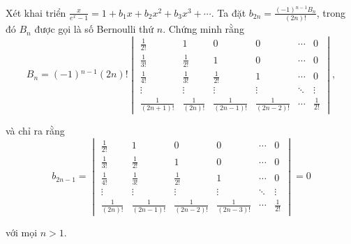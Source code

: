 \begin{exercise}
    Xét khai triển $\frac{x}{e^{x} - 1} = 1 + b_{1}x + b_{2}x^{2} + b_{3}x^{3} + \cdots$. Ta đặt $b_{2n} = \frac{(-1){}^{n-1}B_{n}}{(2n)!}$, trong đó $B_{n}$ được gọi là số Bernoulli thứ $n$. Chứng minh rằng
    \[
        B_{n} = (-1){}^{n-1}(2n)!
        \begin{vmatrix}
            \frac{1}{2!}      & 1               & 0                 & 0                 & \cdots & 0            \\
            \frac{1}{3!}      & \frac{1}{2!}    & 1                 & 0                 & \cdots & 0            \\
            \frac{1}{4!}      & \frac{1}{3!}    & \frac{1}{2!}      & 1                 & \cdots & 0            \\
            \vdots            & \vdots          & \vdots            & \vdots            & \ddots & \vdots       \\
            \frac{1}{(2n+1)!} & \frac{1}{(2n)!} & \frac{1}{(2n-1)!} & \frac{1}{(2n-2)!} & \cdots & \frac{1}{2!}
        \end{vmatrix},
    \]
    
    và chỉ ra rằng
    \[
        b_{2n-1} =
        \begin{vmatrix}
            \frac{1}{2!}    & 1                 & 0                 & 0                 & \cdots & 0            \\
            \frac{1}{3!}    & \frac{1}{2!}      & 1                 & 0                 & \cdots & 0            \\
            \frac{1}{4!}    & \frac{1}{3!}      & \frac{1}{2!}      & 1                 & \cdots & 0            \\
            \vdots          & \vdots            & \vdots            & \vdots            & \ddots & \vdots       \\
            \frac{1}{(2n)!} & \frac{1}{(2n-1)!} & \frac{1}{(2n-2)!} & \frac{1}{(2n-3)!} & \cdots & \frac{1}{2!}
        \end{vmatrix}
        = 0
    \]
    
    với mọi $n > 1$.
\end{exercise}


